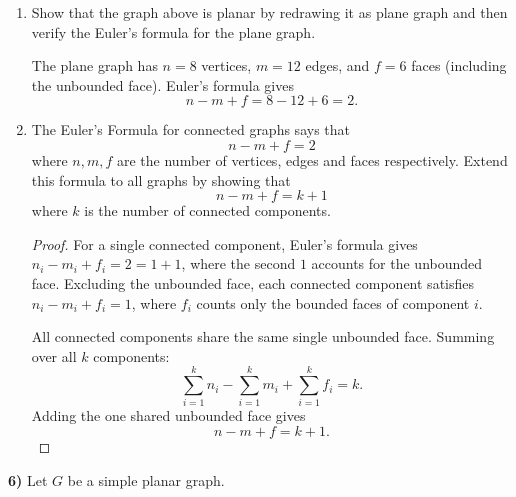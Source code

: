 \documentclass[12pt]{article}
\begin{document}
\begin{enumerate}
\item[a)] Show that the graph above is planar by redrawing it as plane graph and then verify the Euler's formula for the plane graph.

\begin{center}
\end{center}

The plane graph has $n = 8$ vertices, $m = 12$ edges, and $f = 6$ faces (including the unbounded face). Euler's formula gives
\[n - m + f = 8 - 12 + 6 = 2.\]

\item[b)] The Euler's Formula for connected graphs says that
\[n - m + f = 2\]
where $n, m, f$ are the number of vertices, edges and faces respectively. Extend this formula to all graphs by showing that
\[n - m + f = k + 1\]
where $k$ is the number of connected components.

\begin{proof}
For a single connected component, Euler's formula gives $n_i - m_i + f_i = 2 = 1 + 1$, where the second $1$ accounts for the unbounded face. Excluding the unbounded face, each connected component satisfies $n_i - m_i + f_i = 1$, where $f_i$ counts only the bounded faces of component $i$.

All connected components share the same single unbounded face. Summing over all $k$ components:
\[\sum_{i=1}^{k} n_i - \sum_{i=1}^{k} m_i + \sum_{i=1}^{k} f_i = k.\]
Adding the one shared unbounded face gives
\[n - m + f = k + 1.\]
\end{proof}
\end{enumerate}

\textbf{6)} Let $G$ be a simple planar graph.
\end{document}
